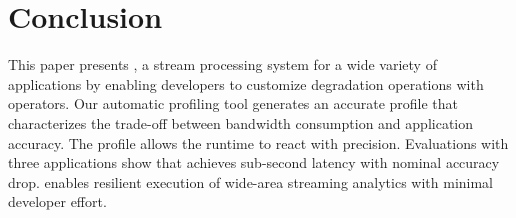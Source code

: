 \section{Conclusion}
\label{sec:conclusion}

This paper presents \sysname{}, a stream processing system for a wide variety of
applications by enabling developers to customize degradation operations with
\maybe{} operators. Our automatic profiling tool generates an accurate profile
that characterizes the trade-off between bandwidth consumption and application
accuracy. The profile allows the runtime to react with precision. Evaluations
with three applications show that \sysname{} achieves sub-second latency with
nominal accuracy drop. \sysname{} enables resilient execution of wide-area
streaming analytics with minimal developer effort.


